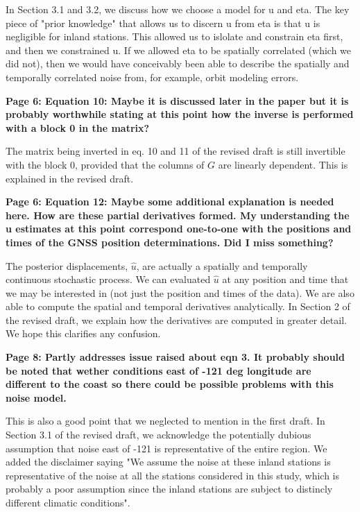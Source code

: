 \documentclass[10pt,a4paper]{letter}
\begin{document}
\begin{letter}{}
In Section 3.1 and 3.2, we discuss how we choose a model for u and
eta. The key piece of "prior knowledge" that allows us to discern u
from eta is that u is negligible for inland stations. This allowed us
to islolate and constrain eta first, and then we constrained u. If we
allowed eta to be spatially correlated (which we did not), then we
would have conceivably been able to describe the spatially and
temporally correlated noise from, for example, orbit modeling errors.

\textbf{Page 6: Equation 10: Maybe it is discussed later in the paper but it
is probably worthwhile stating at this point how the inverse is
performed with a block 0 in the matrix?}

The matrix being inverted in eq. 10 and 11 of the revised draft is
still invertible with the block 0, provided that the columns of
$G$ are linearly dependent. This is explained in the revised
draft.

\textbf{Page 6: Equation 12: Maybe some additional explanation is
needed here. How are these partial derivatives formed.  My
understanding the u estimates at this point correspond one-to-one with
the positions and times of the GNSS position determinations.  Did I
miss something?}

The posterior displacements, $\hat{u}$, are actually a spatially and
temporally continuous stochastic process. We can evaluated $\hat{u}$
at any position and time that we may be interested in (not just the
position and times of the data). We are also able to compute the
spatial and temporal derivatives analytically. In Section 2 of the
revised draft, we explain how the derivatives are computed in greater
detail. We hope this clarifies any confusion.

\textbf{Page 8: Partly addresses issue raised about eqn 3.  It
probably should be noted that wether conditions east of -121 deg
longitude are different to the coast so there could be possible
problems with this noise model.}

This is also a good point that we neglected to mention in the first
draft. In Section 3.1 of the revised draft, we acknowledge the
potentially dubious assumption that noise east of -121 is
representative of the entire region. We added the disclaimer saying
"We assume the noise at these inland stations is representative of the
noise at all the stations considered in this study, which is probably
a poor assumption since the inland stations are subject to distincly
different climatic conditions".


\end{letter}
\end{document}
